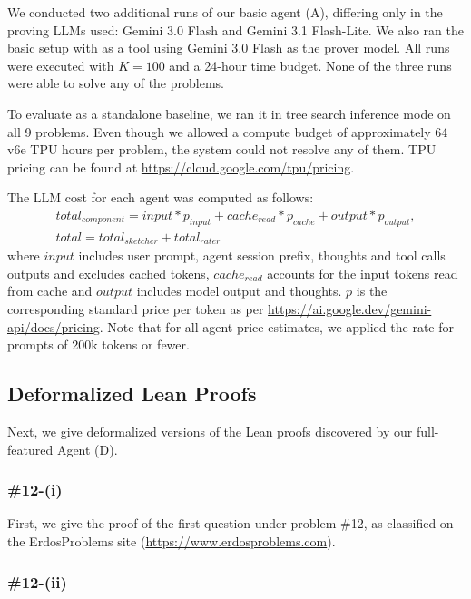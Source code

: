 We conducted two additional runs of our basic agent (A), differing only in the proving LLMs used: Gemini 3.0 Flash and Gemini 3.1 Flash-Lite. We also ran the basic setup with {\AP} as a tool using Gemini 3.0 Flash as the prover model. All runs were executed with $K=100$ and a 24-hour time budget. None of the three runs were able to solve any of the {\erdos} problems.

To evaluate {\AP} as a standalone baseline, we ran it in tree search inference mode on all 9 {\erdos} problems. 
Even though we allowed a compute budget of approximately 64 v6e TPU hours per problem, the system could not resolve any of them. TPU pricing can be found at \url{https://cloud.google.com/tpu/pricing}.

The LLM cost for each agent was computed as follows:
\begin{gather*}
total_{component} = input * p_{input} + cache_{read} * p_{cache} + output * p_{output}, \\
total = total_{sketcher} + total_{rater}
\end{gather*}
where $input$ includes user prompt, agent session prefix, thoughts and tool calls outputs and excludes cached tokens, $cache_{read}$ accounts for the input tokens read from cache and $output$ includes model output and thoughts. $p$ is the corresponding standard price per token as per \url{https://ai.google.dev/gemini-api/docs/pricing}. Note that for all agent price estimates, we applied the rate for prompts of 200k tokens or fewer.


\subsection{Deformalized Lean Proofs}

Next, we give deformalized versions of the Lean proofs discovered by our full-featured Agent (D). 

\subsubsection*{{\erdos} \#12-(i)}
First, we give the proof of the first question under {\erdos} problem \#12, as classified on the ErdosProblems site (\url{https://www.erdosproblems.com}). 



\subsubsection*{{\erdos} \#12-(ii)}


